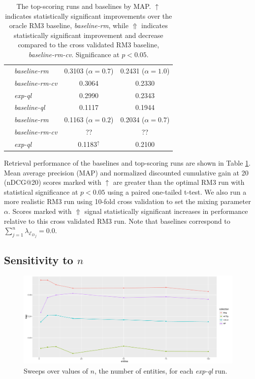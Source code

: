\documentclass{article}
\begin{document}
\begin{table}[htbp]
\begin{tabular}{|c|l|c|c|}
\rule{0pt}{2.5ex} & {\it baseline-rm} & 0.3103 ($\alpha=0.7$) & 0.2431 ($\alpha=1.0$)\\ \cline{2-4}
\rule{0pt}{2.5ex} & {\it baseline-rm-cv} & 0.3064 & 0.2330 \\ \cline{2-4}
\rule{0pt}{2.5ex} & {\it exp-ql} & 0.2990 & 0.2343 \\ \hline\hline
\rule{0pt}{2.5ex} \multirow{3}{*}{clueweb09} & {\it baseline-ql} & 0.1117 & 0.1944 \\ \cline{2-4}
\rule{0pt}{2.5ex} & {\it baseline-rm} & 0.1163 ($\alpha=0.2$) & 0.2034 ($\alpha=0.7$) \\ \cline{2-4}
\rule{0pt}{2.5ex} & {\it baseline-rm-cv} & ?? & ?? \\ \cline{2-4}
\rule{0pt}{2.5ex} & {\it exp-ql} & 0.1183$^{\uparrow}$ & 0.2100 \\ \hline
\end{tabular}
\caption{The top-scoring runs and baselines by MAP. $\uparrow$ indicates statistically significant improvements over the oracle RM3 baseline, \textit{baseline-rm}, while $\Uparrow$ indicates statistically significant improvement and decrease compared to the cross validated RM3 baseline, \textit{baseline-rm-cv}. Significance at $p < 0.05$.}
\label{table.performance}
\end{table}

Retrieval performance of the baselines and top-scoring runs are shown in Table \ref{table.performance}. Mean average precision (MAP) and normalized discounted cumulative gain at 20 (nDCG@20) scores marked with $\uparrow$ are greater than the optimal RM3 run with statistical significance at $p < 0.05$ using a paired one-tailed t-test. We also run a more realistic RM3 run using 10-fold cross validation to set the mixing parameter $\alpha$. Scores marked with $\Uparrow$ signal statistically significant increases in performance relative to this cross validated RM3 run. Note that baselines correspond to $\sum_{j=1}^n \lambda_{{\mathcal{E}_D}_j} = 0.0$. 

\subsection{Sensitivity to $n$}\label{section.n-sensitivity}

\begin{figure}[!htb]
\centering
\includegraphics[width=\columnwidth]{figures/n-sweep.pdf}
\caption{Sweeps over values of $n$, the number of entities, for each \textit{exp-ql} run.}
\label{figure.n-sweeps}
\end{figure}
\end{document}
